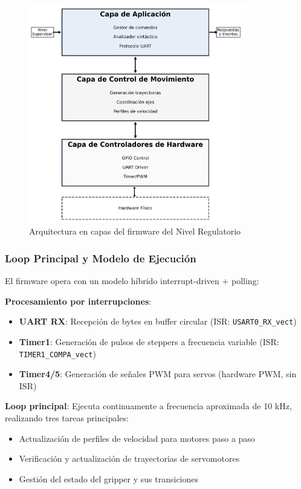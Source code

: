 \begin{figure}[H]
    \centering
    \includegraphics[width=0.85\textwidth]{imagenes/arquitectura_regulatorio_capas.png}
    \caption{Arquitectura en capas del firmware del Nivel Regulatorio}
    \label{fig:arquitectura_regulatorio}
\end{figure}

\subsubsection{Loop Principal y Modelo de Ejecución}

El firmware opera con un modelo híbrido interrupt-driven + polling:

\textbf{Procesamiento por interrupciones}:
\begin{itemize}
    \item \textbf{UART RX}: Recepción de bytes en buffer circular (ISR: \texttt{USART0\_RX\_vect})
    \item \textbf{Timer1}: Generación de pulsos de steppers a frecuencia variable (ISR: \texttt{TIMER1\_COMPA\_vect})
    \item \textbf{Timer4/5}: Generación de señales PWM para servos (hardware PWM, sin ISR)
\end{itemize}

\textbf{Loop principal}: Ejecuta continuamente a frecuencia aproximada de 10 kHz, realizando tres tareas principales:
\begin{itemize}
    \item Actualización de perfiles de velocidad para motores paso a paso
    \item Verificación y actualización de trayectorias de servomotores
    \item Gestión del estado del gripper y sus transiciones
\end{itemize}

